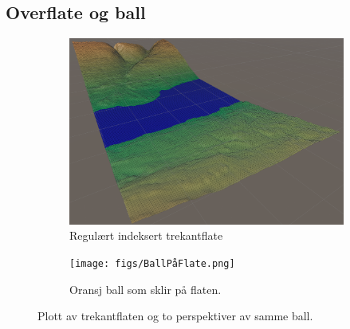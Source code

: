 \documentclass[norsk, doc, 11pt, a4paper]{apa7}  %
\begin{document}
\subsection{Overflate og ball} \label{fig:ball}
\begin{figure}[H]
	\centering
	\begin{subfigure}{.5\textwidth}
		\centering
		\includegraphics[width=.9\linewidth]{figs/surfaceGrid.png}
		\caption{Regulært indeksert trekantflate}
	\end{subfigure}%
	\begin{subfigure}{.5\textwidth}
		\centering
		\texttt{[image: figs/BallPåFlate.png]}
		\caption{Oransj ball som sklir på flaten.}
	\end{subfigure}
	\caption{Plott av trekantflaten og to perspektiver av samme ball.}
\end{figure}
\end{document}
